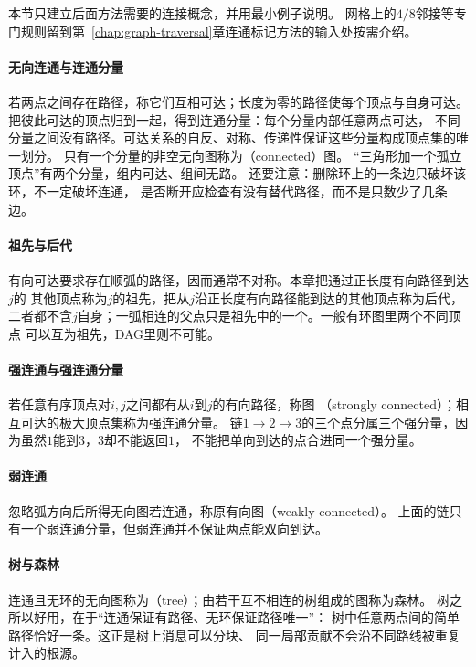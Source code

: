 本节只建立后面方法需要的连接概念，并用最小例子说明。
网格上的$4/8$邻接等专门规则留到第~\ref{chap:graph-traversal}章连通标记方法的输入处按需介绍。

\paragraph{无向连通与连通分量}
若两点之间存在路径，称它们互相可达；长度为零的路径使每个顶点与自身可达。
把彼此可达的顶点归到一起，得到连通分量：每个分量内部任意两点可达，
不同分量之间没有路径。可达关系的自反、对称、传递性保证这些分量构成顶点集的唯一划分。
只有一个分量的非空无向图称为（connected）图。
“三角形加一个孤立顶点”有两个分量，组内可达、组间无路。
还要注意：删除环上的一条边只破坏该环，不一定破坏连通，
是否断开应检查有没有替代路径，而不是只数少了几条边。

\paragraph{祖先与后代}
有向可达要求存在顺弧的路径，因而通常不对称。本章把通过正长度有向路径到达$j$的
其他顶点称为$j$的祖先，把从$j$沿正长度有向路径能到达的其他顶点称为后代，
二者都不含$j$自身；一弧相连的父点只是祖先中的一个。一般有环图里两个不同顶点
可以互为祖先，DAG里则不可能。

\paragraph{强连通与强连通分量}
若任意有序顶点对$i,j$之间都有从$i$到$j$的有向路径，称图
（strongly connected）；相互可达的极大顶点集称为强连通分量。
链$1\to2\to3$的三个点分属三个强分量，因为虽然$1$能到$3$，$3$却不能返回$1$，
不能把单向到达的点合进同一个强分量。

\paragraph{弱连通}
忽略弧方向后所得无向图若连通，称原有向图（weakly connected）。
上面的链只有一个弱连通分量，但弱连通并不保证两点能双向到达。

\paragraph{树与森林}
连通且无环的无向图称为（tree）；由若干互不相连的树组成的图称为森林。
树之所以好用，在于“连通保证有路径、无环保证路径唯一”：
树中任意两点间的简单路径恰好一条。这正是树上消息可以分块、
同一局部贡献不会沿不同路线被重复计入的根源。

